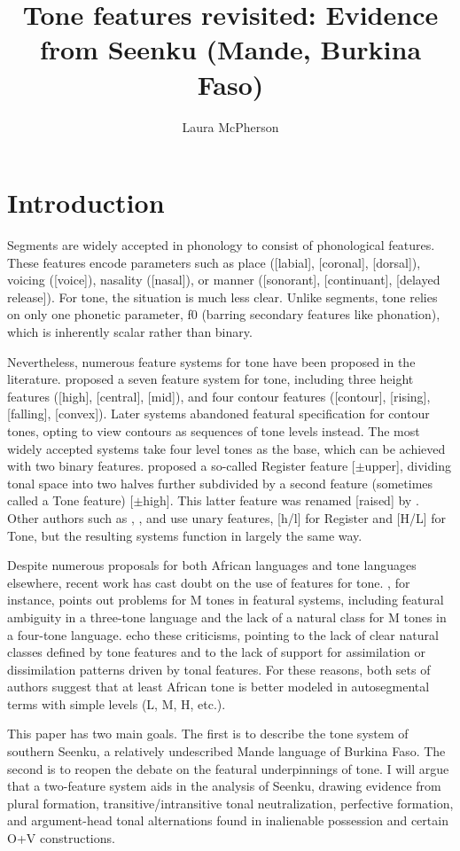 \documentclass[output=paper]{langsci/langscibook}
\title{Tone features revisited: Evidence from Seenku (Mande, Burkina Faso)}
\author{%
Laura McPherson \affiliation{Dartmouth College} 
}
\begin{document}
 \section{Introduction}
 
 Segments are widely accepted in phonology to consist of phonological features. These features encode parameters such as place ([labial], [coronal], [dorsal]), voicing ([voice]), nasality ([nasal]), or manner ([sonorant], [continuant], [delayed release]). For tone, the situation is much less clear. Unlike segments, tone relies on only one phonetic parameter, f0 (barring secondary features like phonation), which is inherently scalar rather than binary.
 
Nevertheless, numerous feature systems for tone have been proposed in the literature. \citet{Wang67} proposed a seven feature system for tone, including three height features ([high], [central], [mid]), and four contour features ([contour], [rising], [falling], [convex]). Later systems abandoned featural specification for contour tones, opting to view contours as sequences of tone levels instead. The most widely accepted systems take four level tones as the base, which can be achieved with two binary features. \citet{Yip80} proposed a so-called Register feature [$\pm$upper], dividing tonal space into two halves further subdivided by a second feature (sometimes called a Tone feature) [$\pm$high]. This latter feature was renamed [raised] by \citet{Pulleyblank86}. Other authors such as \citet{Clements83}, \citet{Snider90}, and \citet{Hyman93} use unary features, [h/l] for Register and [H/L] for Tone, but the resulting systems function in largely the same way.

Despite numerous proposals for both African languages and tone languages elsewhere, recent work has cast doubt on the use of features for tone. \citet{Hyman10b}, for instance, points out problems for M tones in featural systems, including featural ambiguity in a three-tone language and the lack of a natural class for M tones in a four-tone language. \citet{Clementsetal10} echo these criticisms, pointing to the lack of clear natural classes defined by tone features and to the lack of support for assimilation or dissimilation patterns driven by tonal features. For these reasons, both sets of authors suggest that at least African tone is better modeled in autosegmental terms with simple levels (L, M, H, etc.).

This paper has two main goals. The first is to describe the tone system of southern Seenku, a relatively undescribed Mande language of Burkina Faso. The second is to reopen the debate on the featural underpinnings of tone. I will argue that a two-feature system aids in the analysis of Seenku, drawing evidence from plural formation, transitive/intransitive tonal neutralization, perfective formation, and argument-head tonal alternations found in inalienable possession and certain O+V constructions.
\end{document}
